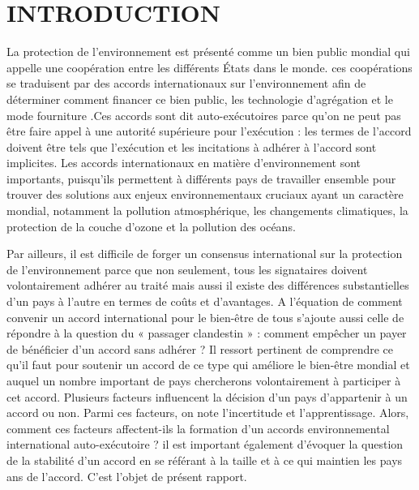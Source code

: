 \documentclass[12pt]{article}
\begin{document}
\section{INTRODUCTION}
\par  La protection de l’environnement est présenté comme un bien public mondial qui appelle une coopération entre les différents États dans le monde. ces coopérations se traduisent par des accords internationaux sur l’environnement afin de déterminer comment financer ce bien public, les technologie d'agrégation et le mode fourniture .Ces accords sont dit auto-exécutoires parce qu'on ne peut pas être faire appel à une autorité supérieure pour l’exécution : les termes de l'accord doivent être tels que l'exécution et les incitations à adhérer à l'accord sont implicites.  Les accords internationaux en matière d'environnement sont importants, puisqu'ils permettent à différents pays de travailler ensemble pour trouver des solutions aux enjeux environnementaux cruciaux ayant un caractère mondial, notamment la pollution atmosphérique, les changements climatiques, la protection de la couche d'ozone et la pollution des océans. 
\par Par ailleurs, il est difficile de forger un consensus international sur la protection de l'environnement parce que non seulement, tous les signataires doivent volontairement adhérer au traité mais aussi il existe des différences substantielles d'un pays à l'autre en termes de coûts et d'avantages. A l’équation de comment convenir un accord international pour le bien-être de tous s’ajoute aussi celle de répondre à la question du « passager clandestin » : comment empêcher un payer de bénéficier d’un accord sans adhérer ? Il ressort pertinent de comprendre ce qu'il faut pour soutenir un accord de ce type qui améliore le bien-être mondial et auquel un nombre important de pays chercherons volontairement à participer à cet accord. Plusieurs facteurs influencent la décision d’un pays d’appartenir à un accord ou non.  Parmi ces facteurs, on note l’incertitude et l’apprentissage. Alors, comment ces facteurs affectent-ils la formation d’un accords environnemental international auto-exécutoire ? il est important également d’évoquer la question de la stabilité d’un accord en se référant à la taille et à ce qui maintien les pays ans de l’accord. C'est l'objet de présent rapport.
\end{document}
